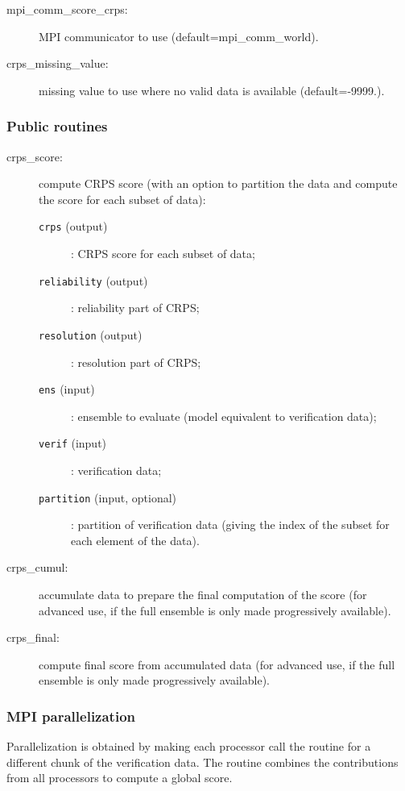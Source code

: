 \documentclass[11pt]{article}
\begin{document}
\begin{description}
\item[mpi\_comm\_score\_crps:] MPI communicator to use (default=mpi\_comm\_world).
\item[crps\_missing\_value:] missing value to use where no valid data is available (default=-9999.).
\end{description}

\subsubsection*{Public routines}

\begin{description}
\item[crps\_score:] compute CRPS score (with an option to partition the data
                    and compute the score for each subset of data):
  \begin{description}
  \item[{\tt crps} (output)]: CRPS score for each subset of data;
  \item[{\tt reliability} (output)]: reliability part of CRPS;
  \item[{\tt resolution} (output)]: resolution part of CRPS;
  \item[{\tt ens} (input)]: ensemble to evaluate (model equivalent to verification data);
  \item[{\tt verif} (input)]: verification data;
  \item[{\tt partition} (input, optional)]: partition of verification data
                                  (giving the index of the subset for each element of the data).
  \end{description}
\item[crps\_cumul:] accumulate data to prepare the final computation of the score
                    (for advanced use, if the full ensemble is only made progressively available).
\item[crps\_final:] compute final score from accumulated data
                    (for advanced use, if the full ensemble is only made progressively available).
\end{description}

\subsubsection*{MPI parallelization}

Parallelization is obtained by making each processor call the routine
for a different chunk of the verification data.
The routine combines the contributions from all processors
to compute a global score.
\end{document}
